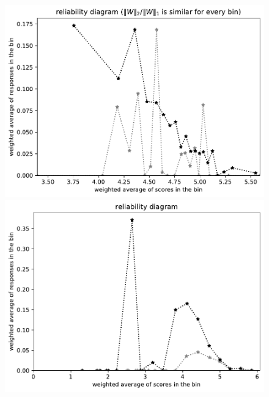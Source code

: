 \documentclass{article}
\newlength{\vertsep}
\newlength{\imsize}
\begin{document}
\begin{figure}
\begin{centering}
\parbox{\imsize}{\includegraphics[width=\imsize]
{../codes/weighted/County_of_Riverside_vs_Butte-LNGI/equierrs20.pdf}}
\quad\quad
\parbox{\imsize}{\includegraphics[width=\imsize]
{../codes/weighted/County_of_Riverside_vs_Butte-LNGI/equiscores20.pdf}}

\vspace{\vertsep}


\end{centering}
\end{figure}
\end{document}
